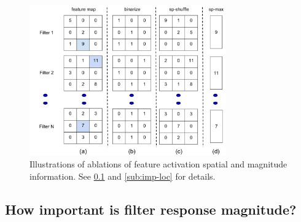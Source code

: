 \begin{figure}[t!]
\centering
\includegraphics[height=6.5cm]{images/ablation.pdf}
\caption{Illustrations of ablations of feature activation spatial and magnitude information.
See \ref{sub:imp-mag} and \ref{sub:imp-loc} for details.}
\label{fig:features}
\end{figure}

\subsection{How important is filter response magnitude?}
\label{sub:imp-mag}
\setlength{\tabcolsep}{4pt}
\begin{table}[t!]
\begin{center}
\caption{Percentage non-zeros (sparsity) in filter responses of various layers of CNN.}
\label{table:sparse}
\vspace{0.3em}
\end{center}
\end{table}
\setlength{\tabcolsep}{1.4pt}


